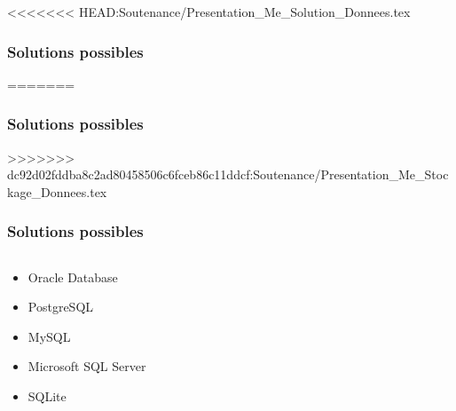 <<<<<<< HEAD:Soutenance/Presentation_Me_Solution_Donnees.tex
\subsubsection[Solutions possibles]{Solutions possibles}
=======
\subsubsection{Solutions possibles}
>>>>>>> dc92d02fddba8c2ad80458506c6fceb86c11ddcf:Soutenance/Presentation_Me_Stockage_Donnees.tex
\begin{frame}
\frametitle{Solutions possibles}
\begin{columns}
\begin{column}{5cm}
\begin{itemize}[<+->]
	\item<2-> Oracle Database
	\item<3-> PostgreSQL
	\item<4-> MySQL
	\item<5-> Microsoft SQL Server
	\item<6-> SQLite
\end{itemize}
\end{column}
\begin{column}{7cm}


\end{column}
\end{columns}
\end{frame}

